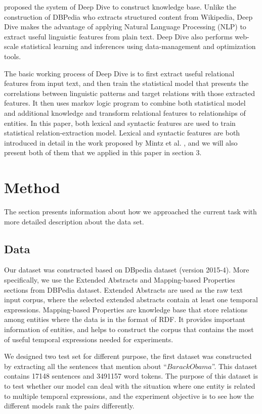 \documentclass[12pt,a4paper]{article}
\begin{document}
\cite{deepdive} proposed the system of Deep Dive to construct knowledge base. Unlike the construction of DBPedia \cite{dbpedia} who extracts structured content from Wikipedia, Deep Dive makes the advantage of applying Natural Language Processing (NLP) to extract useful linguistic features from plain text. Deep Dive also performs web-scale statistical learning and inferences using data-management and optimization tools.

The basic working process of Deep Dive is to first extract useful relational features from input text, and then train the statistical model that presents the correlations between linguistic patterns and target relations with those extracted features. It then uses markov logic program to combine both statistical model and additional knowledge and transform relational features to relationships of entities. In this paper, both lexical and syntactic features are used to train statistical relation-extraction model. Lexical and syntactic features are both introduced in detail in the work proposed by Mintz et al. \cite{Mintz}, and we will also present both of them that we applied in this paper in section 3.
\section{Method}
The section presents information about how we approached the current task with more detailed description about the data set. 

\subsection{Data}
Our dataset was constructed based on DBpedia dataset (version 2015-4). More specifically, we use the Extended Abstracts and Mapping-based Properties sections from DBPedia dataset.  Extended Abstracts are used as the raw text input corpus, where the selected extended abstracts contain at least one temporal expressions. Mapping-based Properties are knowledge base that store relations among entities where the data is in the format of RDF. It provides important information of entities, and helps to construct the corpus that contains the most of useful temporal expressions needed for experiments.

We designed two test set for different purpose, the first dataset was constructed by extracting all the sentences that mention about “$Barack Obama$”. This dataset contains 17148 sentences and 3491157 word tokens. The purpose of this dataset is to test whether our model can deal with the situation where one entity is related to multiple temporal expressions, and the experiment objective is to see how the different models rank the pairs differently.
\end{document}

